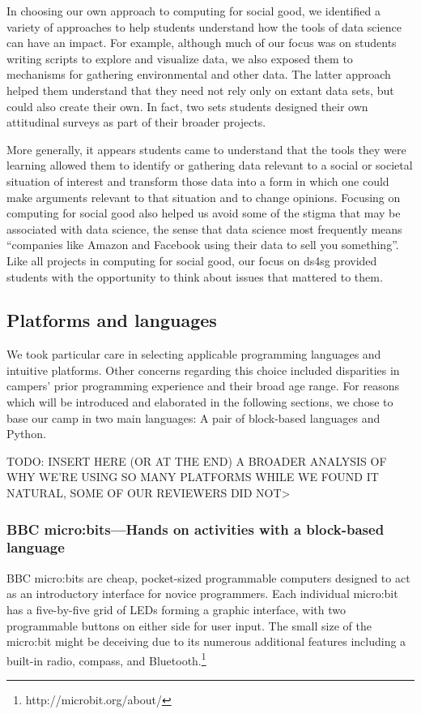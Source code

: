 In choosing our own approach to computing for social good, we
identified a variety of approaches to help students understand how
the tools of data science can have an impact.  For example, although 
much of our focus was on students writing scripts to explore and
visualize data, we also exposed them to mechanisms for gathering
environmental and other data.  The latter approach helped them understand
that they need not rely only on extant data sets, but could also
create their own.  In fact, two sets students designed their own attitudinal
surveys as part of their broader projects.

More generally, it appears students came to understand that the
tools they were learning allowed them to identify or gathering data
relevant to a social or societal situation of interest and transform
those data into a form in which one could make arguments relevant
to that situation and to change opinions.  Focusing on computing
for social good also helped us avoid some of the stigma that may
be associated with data science, the sense that data science most
frequently means ``companies like Amazon and Facebook using their
data to sell you something''.  Like all projects in computing for
social good, our focus on ds4sg provided students with the opportunity
to think about issues that mattered to them.

\subsection{Platforms and languages}

We took particular care in selecting applicable programming languages
and intuitive platforms. Other concerns regarding this choice
included disparities in campers' prior programming experience and
their broad age range. For reasons which will be introduced and
elaborated in the following sections, we chose to base our camp in
two main languages: A pair of block-based languages and Python.

TODO: INSERT HERE (OR AT THE END) A BROADER ANALYSIS OF WHY WE'RE
USING SO MANY PLATFORMS  WHILE WE FOUND IT NATURAL, SOME OF OUR
REVIEWERS DID NOT>

\subsubsection{BBC micro:bits---Hands on activities with a block-based language}

BBC micro:bits are cheap, pocket-sized programmable computers
designed to act as an introductory interface for novice programmers.
Each individual micro:bit has a five-by-five grid of LEDs forming
a graphic interface, with two programmable buttons on either side
for user input.  The small size of the micro:bit might be deceiving
due to its numerous additional features including a built-in radio,
compass, and Bluetooth.\footnote{http://microbit.org/about/}

